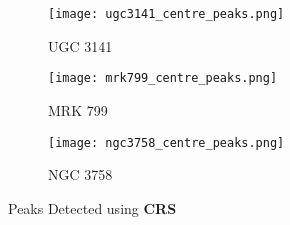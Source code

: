\documentclass[12pt]{article}
\begin{document}
\begin{figure}[!b]
    \begin{subfigure}[h]{0.32\textwidth}
        \texttt{[image: ugc3141\_centre\_peaks.png]}
        \caption{UGC 3141}
        \label{fig:ugc3141_centre_peaks}
    \end{subfigure}
    \hfill
    \begin{subfigure}[h]{0.32\textwidth}
        \texttt{[image: mrk799\_centre\_peaks.png]}
        \caption{MRK 799}
        \label{fig:mrk799_centre_peaks}
    \end{subfigure}
    \hfill
    \begin{subfigure}[h]{0.32\textwidth}
        \texttt{[image: ngc3758\_centre\_peaks.png]}
        \caption{NGC 3758}
        \label{fig:ngc3758_centre_peaka}
    \end{subfigure}
    
    \caption{Peaks Detected using \textbf{CRS}}
    \label{fig:crs_peaks}
\end{figure}
\end{document}
